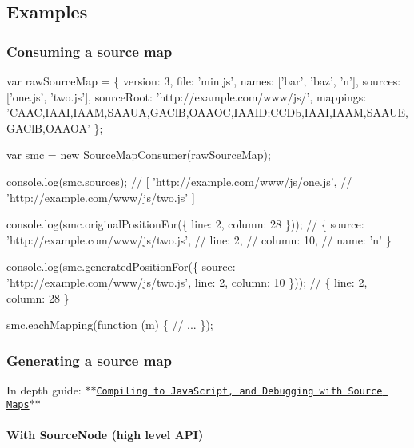\subsection*{Examples}

\subsubsection*{Consuming a source map}


\begin{DoxyCode}
var rawSourceMap = \{
  version: 3,
  file: \textcolor{stringliteral}{'min.js'},
  names: [\textcolor{stringliteral}{'bar'}, \textcolor{stringliteral}{'baz'}, \textcolor{charliteral}{'n'}],
  sources: [\textcolor{stringliteral}{'one.js'}, \textcolor{stringliteral}{'two.js'}],
  sourceRoot: \textcolor{stringliteral}{'http://example.com/www/js/'},
  mappings: \textcolor{stringliteral}{'CAAC,IAAI,IAAM,SAAUA,GAClB,OAAOC,IAAID;CCDb,IAAI,IAAM,SAAUE,GAClB,OAAOA'}
\};

var smc = \textcolor{keyword}{new} SourceMapConsumer(rawSourceMap);

console.log(smc.sources);
\textcolor{comment}{// [ 'http://example.com/www/js/one.js',}
\textcolor{comment}{//   'http://example.com/www/js/two.js' ]}

console.log(smc.originalPositionFor(\{
  line: 2,
  column: 28
\}));
\textcolor{comment}{// \{ source: 'http://example.com/www/js/two.js',}
\textcolor{comment}{//   line: 2,}
\textcolor{comment}{//   column: 10,}
\textcolor{comment}{//   name: 'n' \}}

console.log(smc.generatedPositionFor(\{
  source: \textcolor{stringliteral}{'http://example.com/www/js/two.js'},
  line: 2,
  column: 10
\}));
\textcolor{comment}{// \{ line: 2, column: 28 \}}

smc.eachMapping(\textcolor{keyword}{function} (m) \{
  \textcolor{comment}{// ...}
\});
\end{DoxyCode}


\subsubsection*{Generating a source map}

In depth guide\+: \href{https://hacks.mozilla.org/2013/05/compiling-to-javascript-and-debugging-with-source-maps/}{\tt $\ast$$\ast$\+Compiling to Java\+Script, and Debugging with Source Maps$\ast$$\ast$}

\paragraph*{With Source\+Node (high level A\+P\+I)}



